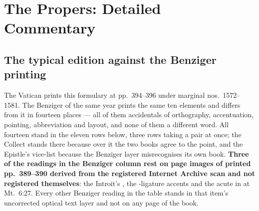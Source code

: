 \section*{The Propers: Detailed Commentary}

\subsection*{The typical edition against the Benziger printing}

The Vatican  prints this formulary at pp.~394--396 under
marginal nos.\ 1572--1581. The Benziger  of the same
year prints the same ten elements and differs from it in fourteen places --- all
of them accidentals of orthography, accentuation, pointing, abbreviation and
layout, and none of them a different word. All fourteen stand in the eleven
rows below, three rows taking a pair at once; the Collect stands there
because over it the two books agree to the point, and the Epistle's vice-list
because the Benziger layer misrecognises its own book. \textbf{Three of the readings in the Benziger
column rest on page images of printed pp.~389--390 derived from the registered
Internet Archive scan and not registered themselves}: the Introit's , the -ligature
accents and the acute in  at Mt.\ 6:27. Every other Benziger
reading in the table stands in that item's uncorrected optical text layer and
not on any page of the book.

